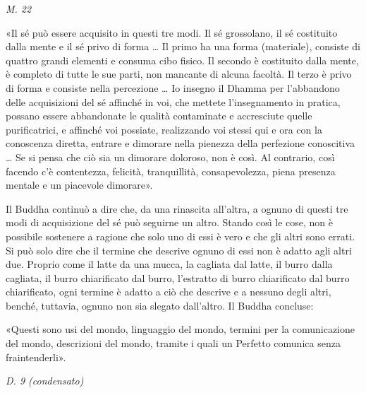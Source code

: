 \emph{M. 22}


«Il sé può essere acquisito in questi tre modi. Il sé grossolano, il sé
costituito dalla mente e il sé privo di forma … Il primo ha una forma
(materiale), consiste di quattro grandi elementi e consuma cibo fisico.
Il secondo è costituito dalla mente, è completo di tutte le sue parti,
non mancante di alcuna facoltà. Il terzo è privo di forma e consiste
nella percezione … Io insegno il Dhamma per l’abbandono delle
acquisizioni del sé affinché in voi, che mettete l’insegnamento in
pratica, possano essere abbandonate le qualità contaminate e accresciute
quelle purificatrici, e affinché voi possiate, realizzando voi stessi
qui e ora con la conoscenza diretta, entrare e dimorare nella pienezza
della perfezione conoscitiva … Se si pensa che ciò sia un dimorare
doloroso, non è così. Al contrario, così facendo c’è contentezza,
felicità, tranquillità, consapevolezza, piena presenza mentale e un
piacevole dimorare».


 Il Buddha continuò a dire che, da una rinascita
all’altra, a ognuno di questi tre modi di acquisizione del sé può
seguirne un altro. Stando così le cose, non è possibile sostenere a
ragione che solo uno di essi è vero e che gli altri sono errati. Si può
solo dire che il termine che descrive ognuno di essi non è adatto agli
altri due. Proprio come il latte da una mucca, la cagliata dal latte, il
burro dalla cagliata, il burro chiarificato dal burro, l’estratto di
burro chiarificato dal burro chiarificato, ogni termine è adatto a ciò
che descrive e a nessuno degli altri, benché, tuttavia, ognuno non sia
slegato dall’altro. Il Buddha concluse:


 «Questi sono usi del mondo, linguaggio del mondo, termini
per la comunicazione del mondo, descrizioni del mondo, tramite i quali
un Perfetto comunica senza fraintenderli».


\emph{D. 9 (condensato)}


